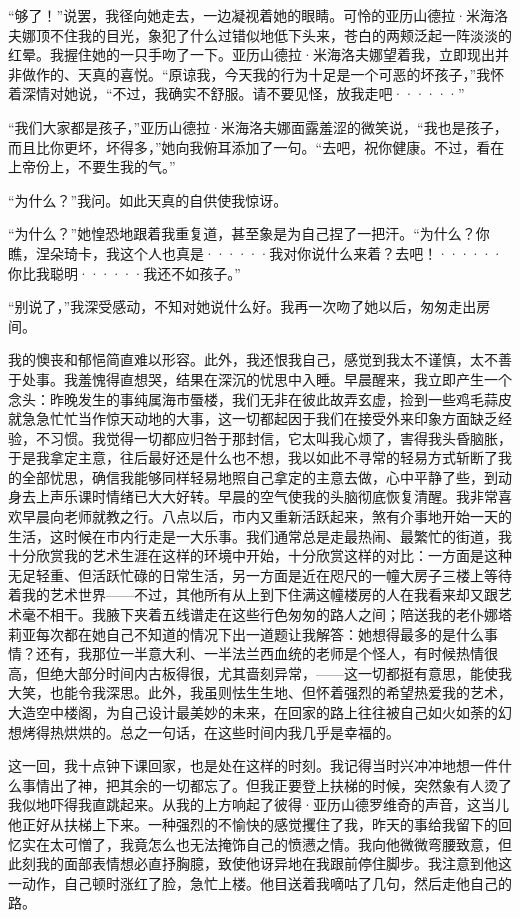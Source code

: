 \documentclass[12pt, UTF8]{ctexbook}
\begin{document}
\par “够了！”说罢，我径向她走去，一边凝视着她的眼睛。可怜的亚历山德拉·米海洛夫娜顶不住我的目光，象犯了什么过错似地低下头来，苍白的两颊泛起一阵淡淡的红晕。我握住她的一只手吻了一下。亚历山德拉·米海洛夫娜望着我，立即现出并非做作的、天真的喜悦。“原谅我，今天我的行为十足是一个可恶的坏孩子，”我怀着深情对她说，“不过，我确实不舒服。请不要见怪，放我走吧······”
\par “我们大家都是孩子，”亚历山德拉·米海洛夫娜面露羞涩的微笑说，“我也是孩子，而且比你更坏，坏得多，”她向我俯耳添加了一句。“去吧，祝你健康。不过，看在上帝份上，不要生我的气。”
\par “为什么？”我问。如此天真的自供使我惊讶。
\par “为什么？”她惶恐地跟着我重复道，甚至象是为自己捏了一把汗。“为什么？你瞧，涅朵琦卡，我这个人也真是······我对你说什么来着？去吧！······你比我聪明······我还不如孩子。”
\par “别说了，”我深受感动，不知对她说什么好。我再一次吻了她以后，匆匆走出房间。
\par 我的懊丧和郁悒简直难以形容。此外，我还恨我自己，感觉到我太不谨慎，太不善于处事。我羞愧得直想哭，结果在深沉的忧思中入睡。早晨醒来，我立即产生一个念头：昨晚发生的事纯属海市蜃楼，我们无非在彼此故弄玄虚，捡到一些鸡毛蒜皮就急急忙忙当作惊天动地的大事，这一切都起因于我们在接受外来印象方面缺乏经验，不习惯。我觉得一切都应归咎于那封信，它太叫我心烦了，害得我头昏脑胀，于是我拿定主意，往后最好还是什么也不想，我以如此不寻常的轻易方式斩断了我的全部忧思，确信我能够同样轻易地照自己拿定的主意去做，心中平静了些，到动身去上声乐课时情绪已大大好转。早晨的空气使我的头脑彻底恢复清醒。我非常喜欢早晨向老师就教之行。八点以后，市内又重新活跃起来，煞有介事地开始一天的生活，这时候在市内行走是一大乐事。我们通常总是走最热闹、最繁忙的街道，我十分欣赏我的艺术生涯在这样的环境中开始，十分欣赏这样的对比：一方面是这种无足轻重、但活跃忙碌的日常生活，另一方面是近在咫尺的一幢大房子三楼上等待着我的艺术世界——不过，其他所有从上到下住满这幢楼房的人在我看来却又跟艺术毫不相干。我腋下夹着五线谱走在这些行色匆匆的路人之间；陪送我的老仆娜塔莉亚每次都在她自己不知道的情况下出一道题让我解答：她想得最多的是什么事情？还有，我那位一半意大利、一半法兰西血统的老师是个怪人，有时候热情很高，但绝大部分时间内古板得很，尤其啬刻异常，——这一切都挺有意思，能使我大笑，也能令我深思。此外，我虽则怯生生地、但怀着强烈的希望热爱我的艺术，大造空中楼阁，为自己设计最美妙的未来，在回家的路上往往被自己如火如荼的幻想烤得热烘烘的。总之一句话，在这些时间内我几乎是幸福的。
\par 这一回，我十点钟下课回家，也是处在这样的时刻。我记得当时兴冲冲地想一件什么事情出了神，把其余的一切都忘了。但我正要登上扶梯的时候，突然象有人烫了我似地吓得我直跳起来。从我的上方响起了彼得·亚历山德罗维奇的声音，这当儿他正好从扶梯上下来。一种强烈的不愉快的感觉攫住了我，昨天的事给我留下的回忆实在太可憎了，我竟怎么也无法掩饰自己的愤懑之情。我向他微微弯腰致意，但此刻我的面部表情想必直抒胸臆，致使他讶异地在我跟前停住脚步。我注意到他这一动作，自己顿时涨红了脸，急忙上楼。他目送着我嘀咕了几句，然后走他自己的路。
\end{document}
